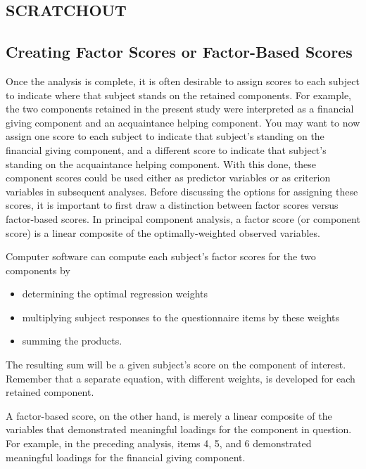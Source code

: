 \subsection{SCRATCHOUT}


\subsection{Creating Factor Scores or Factor-Based Scores}

Once the analysis is complete, it is often desirable to assign scores to each subject to indicate
where that subject stands on the retained components. For example, the two components
retained in the present study were interpreted as a financial giving component and an
acquaintance helping component. You may want to now assign one score to each subject to
indicate that subject’s standing on the financial giving component, and a different score to
indicate that subject’s standing on the acquaintance helping component. With this done, these
component scores could be used either as predictor variables or as criterion variables in
subsequent analyses.
Before discussing the options for assigning these scores, it is important to first draw a distinction
between factor scores versus factor-based scores. In principal component analysis, a factor
score (or component score) is a linear composite of the optimally-weighted observed variables.

Computer software can compute each subject’s factor scores for the two components
by

\begin{itemize}
\item determining the optimal regression weights
\item multiplying subject responses to the questionnaire items by these weights
\item summing the products.
\end{itemize}

The resulting sum will be a given subject’s score on the component of interest. Remember that a
separate equation, with different weights, is developed for each retained component.

A factor-based score, on the other hand, is merely a linear composite of the variables that
demonstrated meaningful loadings for the component in question. For example, in the preceding
analysis, items 4, 5, and 6 demonstrated meaningful loadings for the financial giving component.

